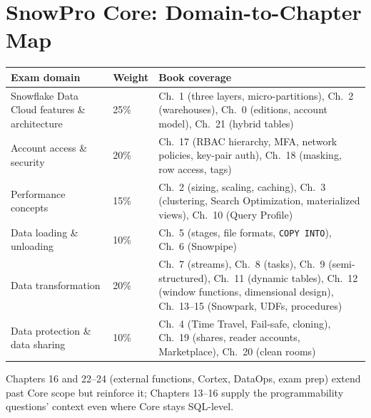 \section{SnowPro Core: Domain-to-Chapter Map}
\begin{center}
\footnotesize
\begin{tabular}{@{}p{5.2cm}p{1.4cm}p{7.2cm}@{}}
\toprule
\textbf{Exam domain} & \textbf{Weight} & \textbf{Book coverage} \\
\midrule
Snowflake Data Cloud features \& architecture & 25\% & Ch.~1 (three layers, micro-partitions), Ch.~2 (warehouses), Ch.~0 (editions, account model), Ch.~21 (hybrid tables) \\
Account access \& security & 20\% & Ch.~17 (RBAC hierarchy, MFA, network policies, key-pair auth), Ch.~18 (masking, row access, tags) \\
Performance concepts & 15\% & Ch.~2 (sizing, scaling, caching), Ch.~3 (clustering, Search Optimization, materialized views), Ch.~10 (Query Profile) \\
Data loading \& unloading & 10\% & Ch.~5 (stages, file formats, \texttt{COPY INTO}), Ch.~6 (Snowpipe) \\
Data transformation & 20\% & Ch.~7 (streams), Ch.~8 (tasks), Ch.~9 (semi-structured), Ch.~11 (dynamic tables), Ch.~12 (window functions, dimensional design), Ch.~13--15 (Snowpark, UDFs, procedures) \\
Data protection \& data sharing & 10\% & Ch.~4 (Time Travel, Fail-safe, cloning), Ch.~19 (shares, reader accounts, Marketplace), Ch.~20 (clean rooms) \\
\bottomrule
\end{tabular}
\end{center}

\noindent Chapters 16 and 22--24 (external functions, Cortex, DataOps, exam prep) extend past
Core scope but reinforce it; Chapters 13--16 supply the programmability questions' context even
where Core stays SQL-level.

